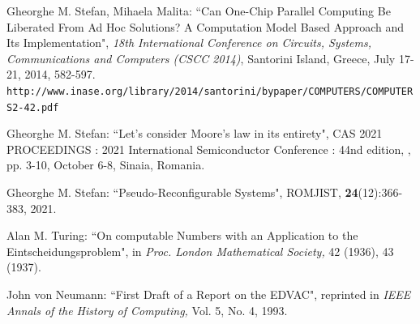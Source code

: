 {\begin{thebibliography}{}

 Gheorghe M. Stefan, Mihaela Malita: ``Can One-Chip Parallel Computing Be Liberated From Ad Hoc Solutions? A Computation Model Based Approach and Its Implementation", {\em 18th International Conference on Circuits, Systems, Communications and Computers (CSCC 2014)}, Santorini Island, Greece, July 17-21, 2014, 582-597. \\ {\tt  http://www.inase.org/library/2014/santorini/bypaper/COMPUTERS/COMPUTERS2-42.pdf}

 Gheorghe M. Stefan:  ``Let's consider Moore's law in its entirety", CAS 2021 PROCEEDINGS : 2021 International Semiconductor Conference : 44nd edition, , pp. 3-10, October 6-8, Sinaia, Romania.

 Gheorghe M. Stefan:  ``Pseudo-Reconfigurable Systems", ROMJIST, {\bf 24}(12):366-383, 2021.






 Alan M. Turing: ``On computable Numbers with an
 Application to the Eintscheidungsproblem", in {\em Proc. London Mathematical
 Society,} 42 (1936), 43 (1937).


 John von Neumann: ``First Draft of a Report on
 the EDVAC", reprinted in {\em IEEE Annals of the History of Computing,}
 Vol. 5, No. 4, 1993.


\end{thebibliography}}
